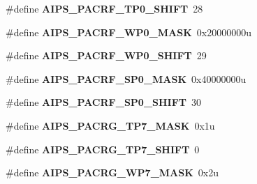 \begin{DoxyCompactItemize}
\item 
\#define {\bfseries A\+I\+P\+S\+\_\+\+P\+A\+C\+R\+F\+\_\+\+T\+P0\+\_\+\+S\+H\+I\+FT}~28\hypertarget{group__AIPS__Register__Masks_ga0662391ff7ae560bf6366f017d3b9ff5}{}\label{group__AIPS__Register__Masks_ga0662391ff7ae560bf6366f017d3b9ff5}

\item 
\#define {\bfseries A\+I\+P\+S\+\_\+\+P\+A\+C\+R\+F\+\_\+\+W\+P0\+\_\+\+M\+A\+SK}~0x20000000u\hypertarget{group__AIPS__Register__Masks_ga3059ddbcdb481c14c1c4475f0c7a2187}{}\label{group__AIPS__Register__Masks_ga3059ddbcdb481c14c1c4475f0c7a2187}

\item 
\#define {\bfseries A\+I\+P\+S\+\_\+\+P\+A\+C\+R\+F\+\_\+\+W\+P0\+\_\+\+S\+H\+I\+FT}~29\hypertarget{group__AIPS__Register__Masks_ga196be9f32f99dc87fb5f465c9a0a8491}{}\label{group__AIPS__Register__Masks_ga196be9f32f99dc87fb5f465c9a0a8491}

\item 
\#define {\bfseries A\+I\+P\+S\+\_\+\+P\+A\+C\+R\+F\+\_\+\+S\+P0\+\_\+\+M\+A\+SK}~0x40000000u\hypertarget{group__AIPS__Register__Masks_gae6cf11d6708087f30efedcabc091b67f}{}\label{group__AIPS__Register__Masks_gae6cf11d6708087f30efedcabc091b67f}

\item 
\#define {\bfseries A\+I\+P\+S\+\_\+\+P\+A\+C\+R\+F\+\_\+\+S\+P0\+\_\+\+S\+H\+I\+FT}~30\hypertarget{group__AIPS__Register__Masks_gabe11d5bdab683e0927748a0a96a63197}{}\label{group__AIPS__Register__Masks_gabe11d5bdab683e0927748a0a96a63197}

\item 
\#define {\bfseries A\+I\+P\+S\+\_\+\+P\+A\+C\+R\+G\+\_\+\+T\+P7\+\_\+\+M\+A\+SK}~0x1u\hypertarget{group__AIPS__Register__Masks_ga31c1a6af89beb1617d51248384fb1b6a}{}\label{group__AIPS__Register__Masks_ga31c1a6af89beb1617d51248384fb1b6a}

\item 
\#define {\bfseries A\+I\+P\+S\+\_\+\+P\+A\+C\+R\+G\+\_\+\+T\+P7\+\_\+\+S\+H\+I\+FT}~0\hypertarget{group__AIPS__Register__Masks_ga0f772b20c70177238887afcead29852b}{}\label{group__AIPS__Register__Masks_ga0f772b20c70177238887afcead29852b}

\item 
\#define {\bfseries A\+I\+P\+S\+\_\+\+P\+A\+C\+R\+G\+\_\+\+W\+P7\+\_\+\+M\+A\+SK}~0x2u\hypertarget{group__AIPS__Register__Masks_ga73a957313268ed8b9d3cc631be94bf3e}{}\label{group__AIPS__Register__Masks_ga73a957313268ed8b9d3cc631be94bf3e}


\end{DoxyCompactItemize}
